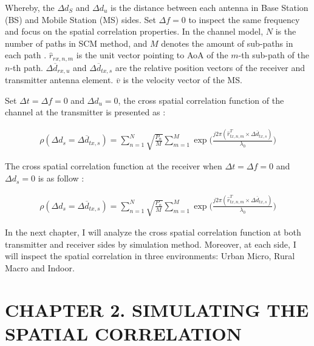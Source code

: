 \documentclass{article} %
\begin{document}
Whereby, the $\Delta d_S$ and $\Delta d_u$ is the distance between each antenna in Base Station (BS) and Mobile Station (MS) sides. Set $\Delta f = 0$ to inspect the same frequency and focus on the spatial correlation properties. In the channel model, $N$ is the number of paths in SCM method, and $M$ denotes the amount of sub-paths in each path \cite{scm_onering}. $\hat{r}_{rx,n,m}$ is the unit vector pointing to AoA of the $m$-th sub-path of the $n$-th path. $\Delta \overline d_{rx, u}$ and $\Delta \overline d_{tx, s}$ are the relative position vectors of the receiver and transmitter antenna element. $\overline v$ is the velocity vector of the MS.


Set $\Delta t = \Delta f = 0$ and $\Delta d_u = 0$, the cross spatial correlation function of the channel at the transmitter is presented as \cite{final_exam}: 
\begin{adjustwidth}{-2cm}{0cm}
\begin{equation} \label{ptBS} 
\begin{split}
    \rho(\Delta d_s = \Delta \overline d_{tx,s}) = \sum_{n=1}^N \sqrt{\frac{P_n}{M}} \sum_{m=1}^M \exp \Big(\frac{j2\pi(\hat{r}_{tx,n,m}^T \times \Delta \overline{d}_{tx,s})}{\lambda_0} \Big)
\end{split}
\end{equation}
\end{adjustwidth}

The cross spatial correlation function at the receiver when $\Delta t = \Delta f = 0$ and $\Delta d_s = 0$ is as follow \cite{final_exam}:
\begin{adjustwidth}{-2cm}{0cm}
\begin{equation} \label{ptMS}
\begin{split}
    \rho(\Delta d_s = \Delta \overline d_{tx,s}) = \sum_{n=1}^N \sqrt{\frac{P_n}{M}} \sum_{m=1}^M \exp \Big(\frac{j2\pi(\hat{r}_{tx,n,m}^T \times \Delta \overline{d}_{tx,s})}{\lambda_0} \Big)
\end{split}
\end{equation}
\end{adjustwidth}

In the next chapter, I will analyze the cross spatial correlation function at both transmitter and receiver sides by simulation method. Moreover, at each side, I will inspect the spatial correlation in three environments: Urban Micro, Rural Macro and Indoor.

\clearpage

\section*{CHAPTER 2. SIMULATING THE SPATIAL CORRELATION}
\setcounter{section}{2}
\setcounter{figure}{0}
\setcounter{table}{0}
\setcounter{subsection}{0}
\end{document}
